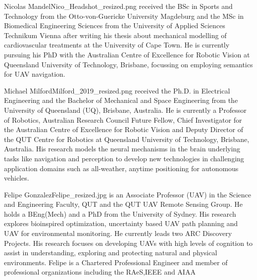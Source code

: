 \documentclass[twocolumn,letterpaper]{IEEEAerospaceCLS}  %
\begin{document}
\thebiography
\begin{biographywithpic}{Nicolas Mandel}{Nico_Headshot_resized.png}
    received the BSc in Sports and Technology from the Otto-von-Guericke University Magdeburg and the MSc in Biomedical Engineering Sciences from the University of Applied Sciences Technikum Vienna after writing his thesis about mechanical modelling of cardiovascular treatments at the University of Cape Town. He is currently pursuing his PhD with the Australian Centre of Excellence for Robotic Vision at Queensland University of Technology, Brisbane, focussing on employing semantics for UAV navigation.
\end{biographywithpic}

\begin{biographywithpic}{Michael Milford}{Milford_2019_resized.png}
    received the Ph.D. in Electrical Engineering and the Bachelor of Mechanical and Space Engineering from the University of Queensland (UQ), Brisbane, Australia. He is currently a Professor of Robotics, Australian Research Council Future Fellow, Chief Investigator for the Australian Centre of Excellence for Robotic Vision and Deputy Director of the QUT Centre for Robotics at Queensland University of Technology, Brisbane, Australia. His research models the neural mechanisms in the brain underlying tasks like navigation and perception to develop new technologies in challenging application domains such as all-weather, anytime positioning for autonomous vehicles.
\end{biographywithpic}

\begin{biographywithpic}{Felipe Gonzalez}{Felipe_resized.jpg}
    is an Associate Professor (UAV) in the Science and Engineering Faculty, QUT and the QUT UAV Remote Sensing Group. He holds a BEng(Mech) and a PhD from the University of Sydney. His research explores bioinspired optimization, uncertainty based UAV path planning and UAV for environmental monitoring. He currently leads two ARC Discovery Projects. His research focuses on developing UAVs with high levels of cognition to assist in understanding, exploring and protecting natural and physical environments. Felipe is a Chartered Professional Engineer and member of professional organizations including the RAeS,IEEE and AIAA
\end{biographywithpic}
\end{document}
